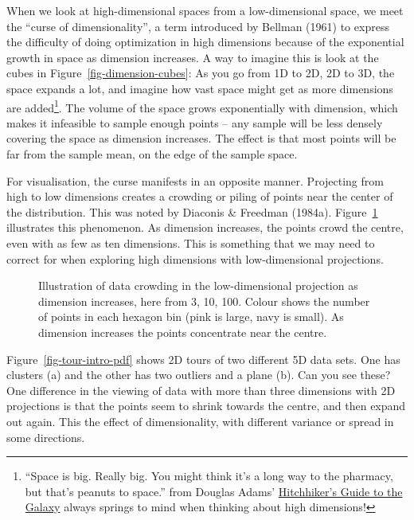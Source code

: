 \documentclass[
  letterpaper,
]{krantz}
\begin{document}
When we look at high-dimensional spaces from a low-dimensional space, we
meet the ``curse of dimensionality'', a term introduced by Bellman
(1961) to express the difficulty of doing optimization in high
dimensions because of the exponential growth in space as dimension
increases. A way to imagine this is look at the cubes in
Figure~\ref{fig-dimension-cubes}: As you go from 1D to 2D, 2D to 3D, the
space expands a lot, and imagine how vast space might get as more
dimensions are added\footnote{``Space is big. Really big. You might
  think it's a long way to the pharmacy, but that's peanuts to space.''
  from Douglas Adams'
  \href{https://en.wikipedia.org/wiki/The_Hitchhiker\%27s_Guide_to_the_Galaxy\#Stage_shows}{Hitchhiker's
  Guide to the Galaxy} always springs to mind when thinking about high
  dimensions!}. The volume of the space grows exponentially with
dimension, which makes it infeasible to sample enough points -- any
sample will be less densely covering the space as dimension increases.
The effect is that most points will be far from the sample mean, on the
edge of the sample space.


For visualisation, the curse manifests in an opposite manner. Projecting
from high to low dimensions creates a crowding or piling of points near
the center of the distribution. This was noted by Diaconis \& Freedman
(1984a). Figure~\ref{fig-density} illustrates this phenomenon. As
dimension increases, the points crowd the centre, even with as few as
ten dimensions. This is something that we may need to correct for when
exploring high dimensions with low-dimensional projections.


\begin{figure}


\caption{\label{fig-density}Illustration of data crowding in the
low-dimensional projection as dimension increases, here from 3, 10, 100.
Colour shows the number of points in each hexagon bin (pink is large,
navy is small). As dimension increases the points concentrate near the
centre.}

\end{figure}%

Figure~\ref{fig-tour-intro-pdf} shows 2D tours of two different 5D data
sets. One has clusters (a) and the other has two outliers and a plane
(b). Can you see these? One difference in the viewing of data with more
than three dimensions with 2D projections is that the points seem to
shrink towards the centre, and then expand out again. This the effect of
dimensionality, with different variance or spread in some directions.
\end{document}

